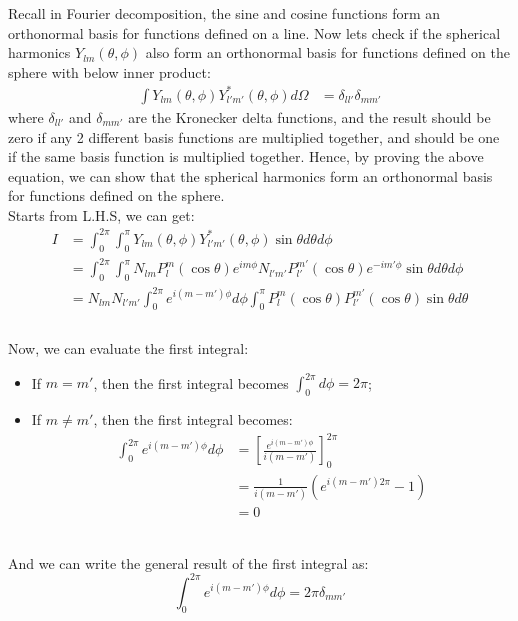 \bigskip \noindent
\begin{foundation}
    Recall in Fourier decomposition, the sine and cosine functions form an orthonormal basis for functions defined on a line. Now lets check if the spherical harmonics $Y_{lm}(\theta, \phi)$ also form an orthonormal basis for functions defined on the sphere with below inner product:
    \begin{align*}
        \int Y_{lm}(\theta, \phi) Y_{l'm'}^*(\theta, \phi) d\Omega
        &= \delta_{ll'} \delta_{mm'}
    \end{align*}
    where $\delta_{ll'}$ and $\delta_{mm'}$ are the Kronecker delta functions, and the result should be zero if any 2 different basis functions are multiplied together, and should be one if the same basis function is multiplied together. Hence, by proving the above equation, we can show that the spherical harmonics form an orthonormal basis for functions defined on the sphere. \\

    Starts from L.H.S, we can get:
    \begin{align*}
        I &= \int^{2\pi}_0 \int^\pi_0 Y_{lm}(\theta, \phi) Y_{l'm'}^*(\theta, \phi) \sin \theta d\theta d\phi \\
        &= \int^{2\pi}_0 \int^\pi_0 N_{lm} P_l^m(\cos \theta) e^{i m \phi} N_{l'm'} P_{l'}^{m'}(\cos \theta) e^{-i m' \phi} \sin \theta d\theta d\phi \\
        &= N_{lm} N_{l'm'} \int^{2\pi}_0 e^{i (m - m') \phi} d\phi \int^\pi_0 P_l^m(\cos \theta) P_{l'}^{m'}(\cos \theta) \sin \theta d\theta \\
    \end{align*} \\

    Now, we can evaluate the first integral:
    \begin{itemize}
        \item If $m = m'$, then the first integral becomes $\int^{2\pi}_0 d\phi = 2\pi$;
        \item If $m \neq m'$, then the first integral becomes:
        \begin{align*}
            \int^{2\pi}_0 e^{i (m - m') \phi} d\phi &= \left[ \frac{e^{i (m - m') \phi}}{i (m - m')} \right]^{2\pi}_0 \\
            &= \frac{1}{i (m - m')} (e^{i (m - m') 2\pi} - 1) \\
            &= 0
        \end{align*}
    \end{itemize} \\
    And we can write the general result of the first integral as:
    \[
        \int^{2\pi}_0 e^{i (m - m') \phi} d\phi = 2\pi \delta_{mm'}
    \]


\end{foundation}
